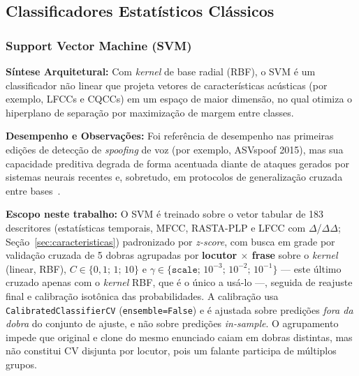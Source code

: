 \documentclass[12pt,a4paper]{article}
\begin{document}
\subsection{Classificadores Estatísticos Clássicos}
\label{subsec:classicos}

\subsubsection[Support Vector Machine (SVM)]{Support Vector Machine (SVM)~\cite{cortes1995support}}
\textbf{Síntese Arquitetural:} Com \textit{kernel} de base radial (RBF), o SVM é um classificador não linear que projeta vetores de características acústicas (por exemplo, LFCCs e CQCCs) em um espaço de maior dimensão, no qual otimiza o hiperplano de separação por maximização de margem entre classes.
\par\textbf{Desempenho e Observações:} Foi referência de desempenho nas primeiras edições de detecção de \textit{spoofing} de voz (por exemplo, ASVspoof 2015), mas sua capacidade preditiva degrada de forma acentuada diante de ataques gerados por sistemas neurais recentes e, sobretudo, em protocolos de generalização cruzada entre bases~\cite{muller2022does}.
\par\textbf{Escopo neste trabalho:} O SVM é treinado sobre o vetor tabular de \num{183} descritores (estatísticas temporais, MFCC, RASTA-PLP e LFCC com $\Delta$/$\Delta\Delta$; Seção~\ref{sec:caracteristicas}) padronizado por \textit{z-score}, com busca em grade por validação cruzada de \num{5} dobras agrupadas por \textbf{locutor $\times$ frase} sobre o \textit{kernel} (linear, RBF), $C \in \{0{,}1;\, 1;\, 10\}$ e $\gamma \in \{\texttt{scale};\, 10^{-3};\, 10^{-2};\, 10^{-1}\}$ --- este último cruzado apenas com o \textit{kernel} RBF, que é o único a usá-lo ---, seguida de reajuste final e calibração isotônica das probabilidades. A calibração usa \texttt{CalibratedClassifierCV} (\texttt{ensemble=False}) e é ajustada sobre predições \emph{fora da dobra} do conjunto de ajuste, e não sobre predições \textit{in-sample}. O agrupamento impede que original e clone do mesmo enunciado caiam em dobras distintas, mas não constitui CV disjunta por locutor, pois um falante participa de múltiplos grupos.
\end{document}
